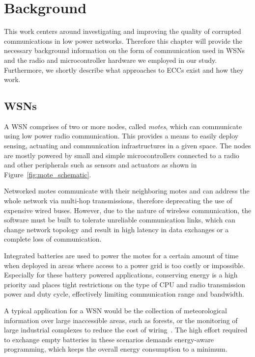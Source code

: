 \chapter{Background}
\label{chap:background}

This work centers around investigating and improving the quality of corrupted communications in low power networks.
Therefore this chapter will provide the necessary background information on the form of communication used in \acl{WSN}s and the radio and microcontroller hardware we employed in our study.
Furthermore, we shortly describe what approaches to \acl{ECC}s exist and how they work.

\section{\acl{WSN}s}

A \acf{WSN} comprises of two or more nodes, called \emph{motes}, which can communicate using low power radio communication.
This provides a means to easily deploy sensing, actuating and communication infrastructures in a given space.
The nodes are mostly powered by small and simple microcontrollers connected to a radio and other peripherals such as sensors and actuators as shown in Figure~\ref{fig:mote_schematic}.

Networked motes communicate with their neighboring motes and can address the whole network via multi-hop transmissions, therefore deprecating the use of expensive wired buses.
However, due to the nature of wireless communication, the software must be built to tolerate unreliable communication links, which can change network topology and result in high latency in data exchanges or a complete loss of communication.

Integrated batteries are used to power the motes for a certain amount of time when deployed in areas where access to a power grid is too costly or impossible.
Especially for these battery powered applications, conserving energy is a high priority and places tight restrictions on the type of CPU and radio transmission power and duty cycle, effectively limiting communication range and bandwidth.

A typical application for a \ac{WSN} would be the collection of meteorological information over large inaccessible areas, such as forests, or the monitoring of large industrial complexes to reduce the cost of wiring~\cite{Boano2009}.
The high effort required to exchange empty batteries in these scenarios demands energy-aware programming, which keeps the overall energy consumption to a minimum.

